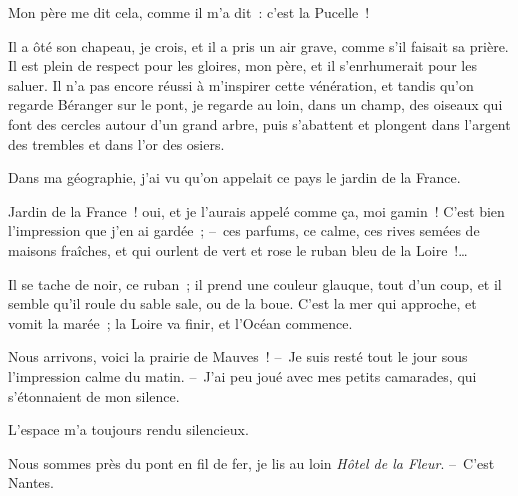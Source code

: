 \documentclass[french,twoside]{book} %
\def\mednobreak{\ifdim\lastskip<\medskipamount
  \removelastskip\nopagebreak\medskip\fi}
\newcommand{\labelblock}[1]{\medbreak{\noindent\color{rubric}\bfseries #1}\par\mednobreak}
\begin{document}
Mon père me dit cela, comme il m’a dit : c’est la Pucelle !\par
Il a ôté son chapeau, je crois, et il a pris un air grave, comme s’il faisait sa prière. Il est plein de respect pour les gloires, mon père, et il s’enrhumerait pour les saluer. Il n’a pas encore réussi à m’inspirer cette vénération, et tandis qu’on regarde Béranger sur le pont, je regarde au loin, dans un champ, des oiseaux qui font des cercles autour d’un grand arbre, puis s’abattent et plongent dans l’argent des trembles et dans l’or des osiers.\par
Dans ma géographie, j’ai vu qu’on appelait ce pays le jardin de la France.\par
Jardin de la France ! oui, et je l’aurais appelé comme ça, moi gamin ! C’est bien l’impression que j’en ai gardée ; – ces parfums, ce calme, ces rives semées de maisons fraîches, et qui ourlent de vert et rose le ruban bleu de la Loire !…\par
Il se tache de noir, ce ruban ; il prend une couleur glauque, tout d’un coup, et il semble qu’il roule du sable sale, ou de la boue. C’est la mer qui approche, et vomit la marée ; la Loire va finir, et l’Océan commence.\par
Nous arrivons, voici la prairie de Mauves ! – Je suis resté tout le jour sous l’impression calme du matin. – J’ai peu joué avec mes petits camarades, qui s’étonnaient de mon silence.\par
L’espace m’a toujours rendu silencieux.\par
Nous sommes près du pont en fil de fer, je lis au loin \emph{Hôtel de la Fleur}. – C’est Nantes.\par

\labelblock{NANTES}
\end{document}
